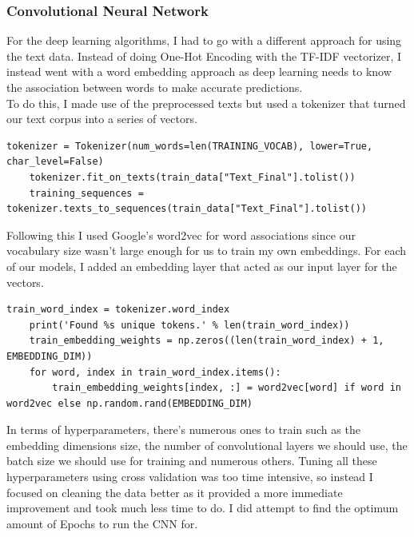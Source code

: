 \documentclass[11pt]{article} %
\begin{document}
\subsubsection{Convolutional Neural Network}
For the deep learning algorithms,  I had to go with a different approach for using the text data.  Instead of doing One-Hot Encoding with the TF-IDF vectorizer,  I instead went with a word embedding approach as deep learning needs to know the association between words to make accurate predictions.\\To do this, I made use of the preprocessed texts but used a tokenizer that turned our text corpus into a series of vectors. 
\begin{verbatim}
tokenizer = Tokenizer(num_words=len(TRAINING_VOCAB), lower=True, char_level=False)
    tokenizer.fit_on_texts(train_data["Text_Final"].tolist())
    training_sequences = tokenizer.texts_to_sequences(train_data["Text_Final"].tolist())
\end{verbatim} 
Following this I used Google’s word2vec for word associations since our vocabulary size wasn’t large enough for us to train my own embeddings. For each of our models, I added an embedding layer that acted as our input layer for the vectors.
\begin{verbatim}
train_word_index = tokenizer.word_index
    print('Found %s unique tokens.' % len(train_word_index))
    train_embedding_weights = np.zeros((len(train_word_index) + 1, EMBEDDING_DIM))
    for word, index in train_word_index.items():
        train_embedding_weights[index, :] = word2vec[word] if word in word2vec else np.random.rand(EMBEDDING_DIM)
\end{verbatim}
In terms of hyperparameters,  there's numerous ones to train such as the embedding dimensions size,  the number of convolutional layers we should use,  the batch size we should use for training and numerous others. Tuning all these hyperparameters using cross validation was too time intensive, so instead I focused on cleaning the data better as it provided a more immediate improvement and took much less time to do.  I did attempt to find the optimum amount of Epochs to run the CNN for. 
\end{document}
